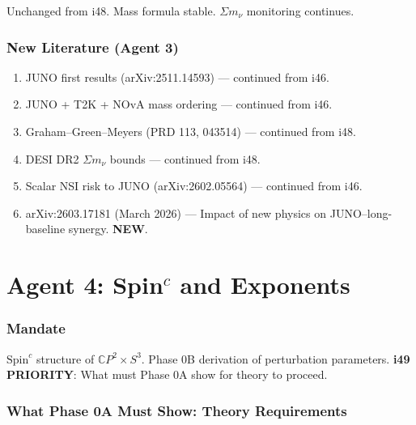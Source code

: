 \documentclass[11pt,a4paper]{article}
\newcommand{\NEW}{\textcolor{dfdblue}{\textbf{NEW}}}
\newcommand{\CP}{\mathbb{C}P}
\begin{document}
Unchanged from i48. Mass formula stable. $\Sigma m_\nu$ monitoring continues.

\section{New Literature (Agent 3)}

\begin{enumerate}
\item JUNO first results (arXiv:2511.14593) --- continued from i46.
\item JUNO + T2K + NOvA mass ordering --- continued from i46.
\item Graham--Green--Meyers (PRD 113, 043514) --- continued from i48.
\item DESI DR2 $\Sigma m_\nu$ bounds --- continued from i48.
\item Scalar NSI risk to JUNO (arXiv:2602.05564) --- continued from i46.
\item arXiv:2603.17181 (March 2026) --- Impact of new physics on JUNO--long-baseline synergy. \NEW.
\end{enumerate}


\part{Agent 4: Spin$^c$ and Exponents}
\label{part:agent4}

\section{Mandate}

$\text{Spin}^c$ structure of $\CP^2 \times S^3$. Phase 0B derivation of perturbation parameters. \textbf{i49 PRIORITY}: What must Phase 0A show for theory to proceed.

\section{What Phase 0A Must Show: Theory Requirements}
\end{document}
